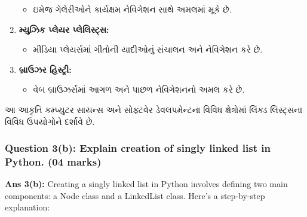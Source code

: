 \begin{enumerate}
  \begin{itemize}
  \tightlist
  \item
    ઇમેજ ગેલેરીઓને કાર્યક્ષમ નેવિગેશન સાથે અમલમાં મૂકે છે.
  \end{itemize}
\item
  \textbf{મ્યુઝિક પ્લેયર પ્લેલિસ્ટ્સ:}

  \begin{itemize}
  \tightlist
  \item
    મીડિયા પ્લેયર્સમાં ગીતોની યાદીઓનું સંચાલન અને નેવિગેશન કરે છે.
  \end{itemize}
\item
  \textbf{બ્રાઉઝર હિસ્ટ્રી:}

  \begin{itemize}
  \tightlist
  \item
    વેબ બ્રાઉઝર્સમાં આગળ અને પાછળ નેવિગેશનનો અમલ કરે છે.
  \end{itemize}
\end{enumerate}

\begin{Shaded}
\begin{Highlighting}[]
\end{Highlighting}
\end{Shaded}

આ આકૃતિ કમ્પ્યુટર સાયન્સ અને સોફ્ટવેર ડેવલપમેન્ટના વિવિધ ક્ષેત્રોમાં લિંક્ડ લિસ્ટ્સના વિવિધ
ઉપયોગોને દર્શાવે છે.

\hypertarget{question-3b-explain-creation-of-singly-linked-list-in-python.-04-marks}{%
\subsubsection{Question 3(b): Explain creation of singly linked list in
Python. (04
marks)}\label{question-3b-explain-creation-of-singly-linked-list-in-python.-04-marks}}

\textbf{Ans 3(b):} Creating a singly linked list in Python involves
defining two main components: a Node class and a LinkedList class.
Here's a step-by-step explanation:

